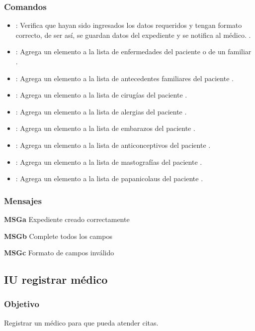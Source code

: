 \subsubsection{Comandos}
\begin{itemize}
	\item {}:  Verifica que hayan sido ingresados los datos requeridos y tengan formato correcto, de ser así, se guardan datos del expediente y se notifica al médico.  .	
	\item {}:  Agrega un elemento a la lista de enfermedades del paciente o de un familiar .
	\item {}:  Agrega un elemento a la lista de antecedentes familiares del paciente .
	\item {}:  Agrega un elemento a la lista de cirugías del paciente .
	\item {}:  Agrega un elemento a la lista de alergias del paciente .
	\item {}:  Agrega un elemento a la lista de embarazos del paciente .
	\item {}:  Agrega un elemento a la lista de anticonceptivos del paciente .
	\item {}:  Agrega un elemento a la lista de mastografías del paciente .
	\item {}:  Agrega un elemento a la lista de papanicolaus del paciente .
\end{itemize}

\subsubsection{Mensajes}
\begin{Citemize}
	\item {\bf MSGa} Expediente creado correctamente
	\item {\bf MSGb} Complete todos los campos
	\item {\bf MSGc} Formato de campos inválido
\end{Citemize}


\subsection{IU registrar médico}

\subsubsection{Objetivo}
Registrar un médico para que pueda atender citas.

